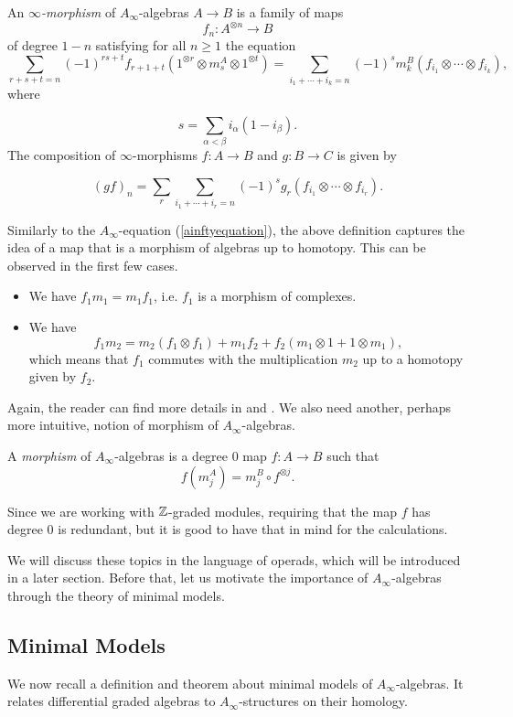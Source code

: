 \documentclass[Thesis.tex]{subfiles}
\begin{document}
\begin{defin}\label{inftymorphism}
An \emph{$\infty$-morphism} of $A_\infty$-algebras $A\to B$ is a family of maps \[f_n:A^{\otimes n}\to B\] of degree $1-n$ satisfying for all $n\geq 1$ the equation
\[\sum_{r+s+t=n} (-1)^{rs+t}f_{r+1+t}(1^{\otimes r} \otimes m^A_s\otimes 1^{\otimes t})=\sum_{i_1+\cdots+i_k=n} (-1)^s m^B_k(f_{i_1}\otimes\cdots\otimes f_{i_k}),\]
where

\[s=\sum_{\alpha<\beta}i_\alpha(1-i_\beta).\]
The composition of $\infty$-morphisms $f:A\to B$ and  $g:B\to C$ is given by 

\[(gf)_n=\sum_r\sum_{i_1+\cdots+i_r=n}(-1)^s g_r(f_{i_1}\otimes\cdots
\otimes f_{i_r}).\]
\end{defin}

Similarly to the $A_\infty$-equation (\ref{ainftyequation}), the above definition captures the idea of a map that is a morphism of algebras up to homotopy. This can be observed in the first few cases.

\begin{itemize}
\item We have $f_1m_1 = m_1f_1$, i.e. $f_1$ is a morphism of complexes.
\item We have
\[
f_1m_2 = m_2 (f_1\otimes f_1) + m_1f_2 + f_2 (m_1\otimes 1 + 1\otimes m_1),\]
which means that $f_1$ commutes with the multiplication $m_2$ up to a homotopy
given by $f_2$.
\end{itemize}

Again, the reader can find more details in \cite{keller} and \cite[\S 9.2]{lodayvallette}. We also need another, perhaps more intuitive, notion of morphism of $A_\infty$-algebras.
 
\begin{defin}\label{inftyalgebramorphism}
A \emph{morphism} of $A_\infty$-algebras is a degree 0 map $f:A\to B$ such that
\[f(m^A_j)=m^B_j\circ f^{\otimes j}.\]
\end{defin}

Since we are working with $\mathbb{Z}$-graded modules, requiring that the map $f$ has degree 0 is redundant, but it is good to have that in mind for the calculations.

We will discuss these topics in the language of operads, which will be introduced in a later section. Before that, let us motivate the importance of $A_\infty$-algebras through the theory of minimal models.

\subsection{Minimal Models}\label{minimalmodels}
We now recall a definition and theorem about minimal models of $A_\infty$-algebras. It relates differential graded algebras to $A_\infty$-structures on their homology.
\end{document}
